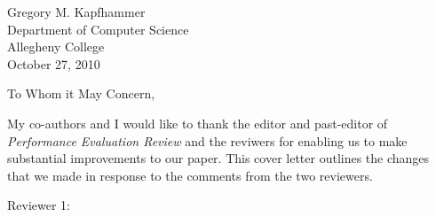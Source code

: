 \documentclass[11pt]{article}
\def\widow#1{\vskip #1\vbadness10000\penalty-200\vskip-#1}
\def\par{\leavevmode\endgraf}
\let\par=\endgraf
\begin{document}

\newtheorem{assume}{Assumption}

\newtheorem{consider}{Consideration}



\theoremstyle{definition}
\newtheorem{definition}{Definition}

\theoremstyle{definition}
\newtheorem{problem}{Problem}

\theoremstyle{definition}
\newtheorem{principle}{Principle}

\def\widow#1{\vskip #1\vbadness10000\penalty-200\vskip-#1}


\makeatletter

\def\maketitle{%
  \thispagestyle{empty}%
  \begin{center}%
    {\Huge \@title\par}%
    {\normalsize \@author\par}%
    \vskip .4in
  \end{center}%

  }

\makeatother

Gregory M. Kapfhammer\\
Department of Computer Science\\
Allegheny College \\
October 27, 2010

\noindent
To Whom it May Concern,

My co-authors and I would like to thank the editor and past-editor of
{\em Performance Evaluation Review} and the reviwers for enabling us
to make substantial improvements to our paper.  This cover letter
outlines the changes that we made in response to the comments from the
two reviewers.

Reviewer 1: \vspace*{-.15in}
\renewcommand{\labelitemi}{$\rightarrow$}
\end{document}
